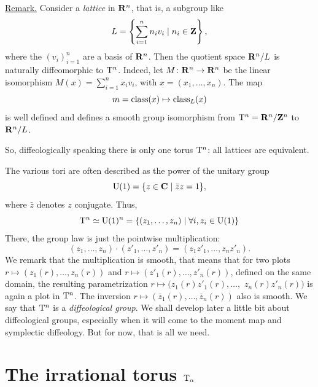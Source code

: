 \uline{Remark.} Consider a \emph{lattice} in $\mathbf{R}^n$,
that is,
a subgroup like
$$%
  L = \left\{ \sum_{i = 1}^n n_i v_i \mid n_i \in \ZZ \right\},
  $$%
where the $(v_i)_{i=1}^n$ are a basis of $\mathbf{R}^n$.
Then the quotient space $\mathbf{R}^n/L$ is naturally diffeomorphic to $\mathrm{T}^n$.
Indeed,
let $M \colon \mathbf{R}^n \to \mathbf{R}^n$ be the linear isomorphism $M(x) = \sum_{i=1}^n x_i v_i$,
with $x = (x_1,\dots,x_n)$.
The map
$$%
  m = \Class(x) \mapsto \Class_L(x)
  $$%
is well defined and defines a smooth group isomorphism from $\mathrm{T}^n = \mathbf{R}^n/\mathbf{Z}^n$ to $\mathbf{R}^n/L$.
\begin{center}
\end{center}
So,
diffeologically speaking there is only one torus $\mathrm{T}^n$:
all lattices are equivalent.

The various tori are often described as the power of the unitary group
$$%
  \U(1) = \{ z \in \CC \mid \bar z z = 1 \},
  $$%
where $\bar z$ denotes $z$ conjugate.
Thus,
$$%
  \Torus^n \simeq \U(1)^n = \{ (z_1,\dots,z_n) \mid \forall i, z_i \in \U(1) \}
  $$%
There,
the group law is just the pointwise multiplication:
$$%
  (z_1,\dots,z_n) \cdot (z'_1,\dots,z'_n) = (z_1z'_1,\dots,z_nz'_n).
  $$%
We remark that the multiplication is smooth,
that means that for two plots $r \mapsto (z_1(r),\dots,z_n(r))$ and $r \mapsto (z'_1(r),\dots,z'_n(r))$,
defined on the same domain,
the resulting parametrization $r \mapsto (z_1(r)z'_1(r),\dots,$%
\linebreak
$z_n(r)z'_n(r))$ is again a plot in $\mathrm{T}^n$.
The inversion $r \mapsto (\bar z_1(r),\dots,\bar z_n(r))$ also is smooth.
We say that $\mathrm{T}^n$ is a \emph{diffeological group}.
We shall develop later a little bit about diffeological groups,
especially when it will come to the moment map and symplectic diffeology.
But for now,
that is all we need.


\section{The irrational torus $\mathrm{T}_\alpha$}

